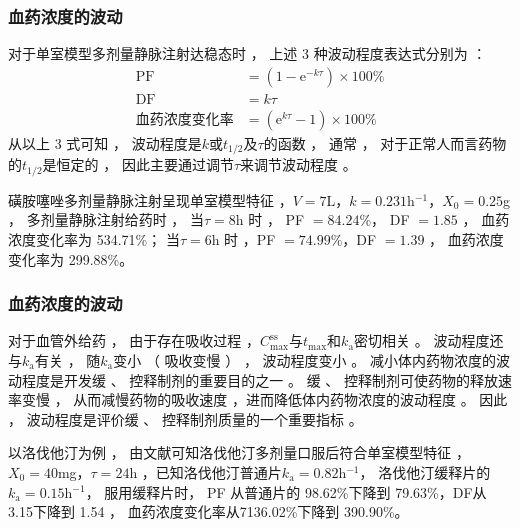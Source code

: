 \documentclass[dvipsnames, svgnames, x11names]{beamer}
\begin{document}
\begin{frame}
	\frametitle{血药浓度的波动}
	对于单室模型多剂量静脉注射达稳态时 ， 上述 3 种波动程度表达式分别为 ：
	\[
		\begin{aligned}
			\mathrm{PF} &=(1-\mathrm{e}^{-k\tau})\times100\% \\
			\mathrm{DF} &=k\tau \\
			\text{血药浓度变化率}&=(\mathrm{e}^{k\tau}-1)\times100\%
		\end{aligned}
	\]
	从以上 3 式可知 ， 波动程度是$k$或$t_{1/2}$及$\tau$的函数 ， 通常 ， 对于正常人而言药物的$t_{1/2}$是恒定的 ， 因此主要通过调节$\tau$来调节波动程度 。
	\begin{blankblock}{}
		磺胺噻唑多剂量静脉注射呈现单室模型特征 ，$V=7$L，$k= 0.231 $h$^{-1}$，$X_0= 0.25$g ， 多剂量静脉注射给药时 ， 当$\tau= 8$h 时 ， PF $= 84.24$\%， DF $= 1.85$ ， 血药浓度变化率为 534.71\%； 当$\tau= 6$h 时 ，PF $= 74.99$\%，DF $= 1.39$ ， 血药浓度变化率为 299.88\%。
	\end{blankblock}
\end{frame}


\begin{frame}
	\frametitle{血药浓度的波动}
	对于血管外给药 ， 由于存在吸收过程 ，$C_{\max}^{\mathrm{ss}}$与$t_{\max}$和$k_\mathrm{a}$密切相关 。 波动程度还与$k_\mathrm{a}$有关 ， 随$k_\mathrm{a}$变小 （ 吸收变慢 ） ， 波动程度变小 。 减小体内药物浓度的波动程度是开发缓 、 控释制剂的重要目的之一 。 缓 、 控释制剂可使药物的释放速率变慢 ， 从而减慢药物的吸收速度 ，进而降低体内药物浓度的波动程度 。 因此 ， 波动程度是评价缓 、 控释制剂质量的一个重要指标 。
	\begin{blankblock}{}
		以洛伐他汀为例 ， 由文献可知洛伐他汀多剂量口服后符合单室模型特征 ，$X_0= 40$mg，$\tau= 24$h ，已知洛伐他汀普通片$k_\mathrm{a}= 0.82$h$^{-1}$， 洛伐他汀缓释片的$k_\mathrm{a}= 0.15$h$^{-1}$， 服用缓释片时， PF 从普通片的 98.62\%下降到 79.63\%，DF从 3.15下降到 1.54 ， 血药浓度变化率从7136.02\%下降到 390.90\%。
	\end{blankblock}
\end{frame}
\end{document}
